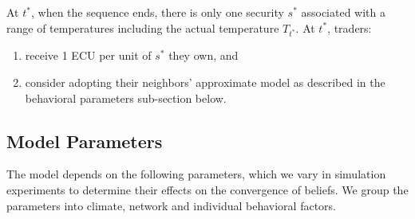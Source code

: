 \documentclass{wscpaperproc}\usepackage[]{graphicx}\usepackage[]{color}
\begin{document}
At $t^*$, when the sequence ends, there is only one security $s^*$ associated with a range of temperatures including the actual temperature $T_{t^*}$.
At $t^*$, traders:

\begin{enumerate}
  \item  receive 1 ECU per unit of $s^*$ they own, and
  \item consider adopting their neighbors' approximate model as described in the behavioral parameters sub-section below.
\end{enumerate}

\subsection{Model Parameters}

The model depends on the following parameters, which we vary in simulation experiments to determine their effects on the convergence of beliefs. We group the parameters into climate, network and individual behavioral factors.
\end{document}
